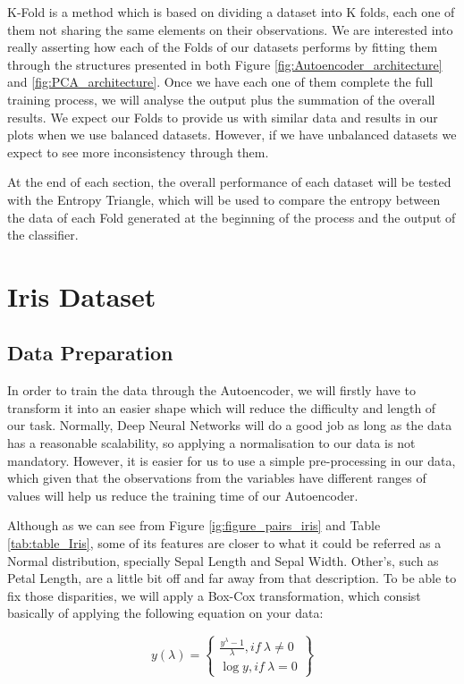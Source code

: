 \documentclass[12pt]{report}
\begin{document}
K-Fold is a method which is based on dividing a dataset into K folds, each one of them not sharing the same elements on their observations. We are interested into really asserting how each of the Folds of our datasets performs by fitting them through the structures presented in both Figure \ref{fig:Autoencoder_architecture} and \ref{fig:PCA_architecture}. Once we have each one of them complete the full training process, we will analyse the output plus the summation of the overall results. We expect our Folds to provide us with similar data and results in our plots when we use balanced datasets. However, if we have unbalanced datasets we expect to see more inconsistency through them.\par

At the end of each section, the overall performance of each dataset will be tested with the Entropy Triangle, which will be used to compare the entropy between the data of each Fold generated at the beginning of the process and the output of the classifier.

\section{Iris Dataset}
\subsection{Data Preparation}

In order to train the data through the Autoencoder, we will firstly have to transform it into an easier shape which will reduce the difficulty and length of our task. Normally, Deep Neural Networks will do a good job as long as the data has a reasonable scalability, so applying a normalisation to our data is not mandatory. However, it is easier for us to use a simple pre-processing in our data, which given that the observations from the variables have different ranges of values will help us reduce the training time of our Autoencoder.

Although as we can see from Figure \ref{ig:figure_pairs_iris} and Table \ref{tab:table_Iris}, some of its features are closer to what it could be referred as a Normal distribution, specially Sepal Length and Sepal Width. Other's, such as Petal Length, are a little bit off and far away from that description. To be able to fix those disparities, we will apply a Box-Cox transformation, which consist basically of applying the following equation on your data:

\begin{equation}
\label{eq:box-cox}
 {y(\lambda)=} \left\{
 \begin{aligned}
        \frac{y^{\lambda} - 1}{\lambda} ,  if \  \lambda \neq 0\\
        {\log y}, if \ \lambda = 0
       \end{aligned}
 \right\}
 \end{equation} 
\newline
\end{document}
